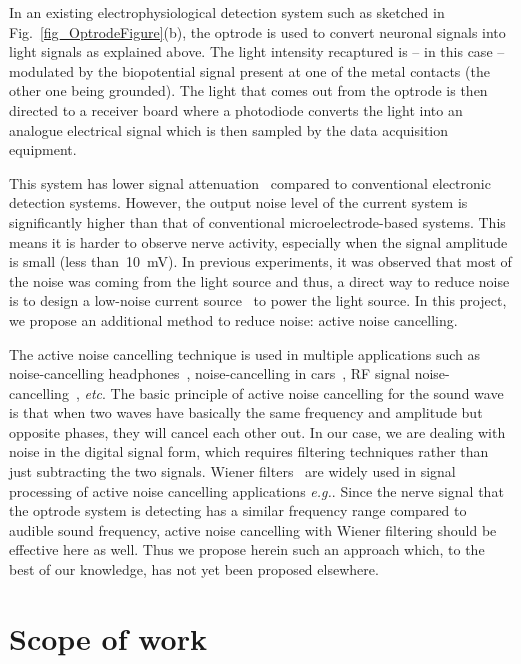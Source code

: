 In an existing electrophysiological  detection system such as sketched in Fig.~\ref{fig_OptrodeFigure}(b), the optrode is used to convert neuronal signals into light signals as explained above.  The light intensity recaptured is -- in this case -- modulated by the biopotential signal present at one of the metal contacts (the other one being grounded). The light that comes out from the optrode is then directed to a receiver board where a photodiode converts the light into an analogue electrical signal which is then sampled by the data acquisition equipment.

This system has lower signal attenuation~\cite{OptrodeArray,ImpedanceOfOptrode} compared to conventional electronic detection systems. However, the output noise level of the current system is significantly higher than that of conventional microelectrode-based systems. This means it is harder to observe nerve activity, especially when the signal amplitude is small (less than~\qty{10}{mV}).  In previous experiments, it was observed that most of the noise was coming from the light source and thus, a direct way to reduce noise is to design a low-noise current source~\cite{LowNoiseCurrentSource} to power the light source.  In this project, we propose an additional method to reduce noise: active noise cancelling.

The active noise cancelling technique is used in multiple applications such as noise-cancelling headphones~\cite{ANC_Headphone_1,ANC_Headphone_2}, noise-cancelling in cars~\cite{ANC_Car}, RF signal noise-cancelling~\cite{ANC_RF}, {\em etc}.  The basic principle of active noise cancelling for the sound wave is that when two waves have basically the same frequency and amplitude but opposite phases, they will cancel each other out.  In our case, we are dealing with noise in the digital signal form, which requires filtering techniques rather than just subtracting the two signals.  Wiener filters~\cite{WienerFilter} are widely used in signal processing of active noise cancelling applications {\em e.g.}\cite{ANC_Wiener_2,ANC_Wiener_3}.  Since the nerve signal that the optrode system is detecting has a similar frequency range compared to audible sound frequency, active noise cancelling with Wiener filtering should be effective here as well. Thus we propose herein such an approach which, to the best of our knowledge, has not yet been proposed elsewhere.


\section{Scope of work}

